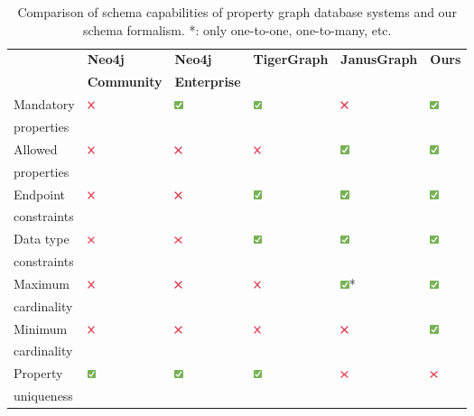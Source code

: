 \documentclass{article}
\theoremstyle{definition}
\newcommand{\yes}{\includegraphics[height=7pt]{figures/check.png}}
\newcommand{\no}{\includegraphics[height=6.5pt]{figures/cross.png}}
\begin{document}
\begin{table}[t]
  \centering
  \begin{tabularx}{\textwidth}{|X|l|l|l|l|l|}
    \hline
                & \textbf{Neo4j}     & \textbf{Neo4j} & \textbf{TigerGraph} & \textbf{JanusGraph} & \textbf{Ours} \\
                & \textbf{Community} & \textbf{Enterprise} &                &                     &               \\
    \hline
    Mandatory   & \no                & \yes                & \yes           & \no                 & \yes          \\
    properties  &                    &                     &                &                     &               \\
    \hline
    Allowed     & \no                & \no                 & \no            & \yes                & \yes          \\
    properties  &                    &                     &                &                     &               \\
    \hline
    Endpoint    & \no                & \no                 & \yes           & \yes                & \yes          \\
    constraints &                    &                     &                &                     &               \\
    \hline
    Data type   & \no                & \no                 & \yes           & \yes                & \yes          \\
    constraints &                    &                     &                &                     &               \\
    \hline
    Maximum     & \no                & \no                 & \no            & \yes*               & \yes          \\
    cardinality &                    &                     &                &                     &               \\
    \hline
    Minimum     & \no                & \no                 & \no            & \no                 & \yes          \\
    cardinality &                    &                     &                &                     &               \\
    \hline
    Property    & \yes               & \yes                & \yes           & \no                 & \no           \\
    uniqueness  &                    &                     &                &                     &               \\
    \hline
  \end{tabularx}
  \caption{Comparison of schema capabilities of property graph database systems and our schema formalism. *: only one-to-one, one-to-many, etc.}
  \label{tab:schema-comparison}
\end{table}
\end{document}
